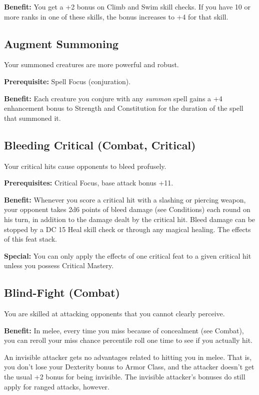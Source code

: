\textbf{Benefit:} You get a +2 bonus on Climb and Swim skill checks. If you have 10 or more ranks in one of these skills, the bonus increases to +4 for that skill.
				
\subsection{Augment Summoning}

				
Your summoned creatures are more powerful and robust.
				
\textbf{Prerequisite:} Spell Focus (conjuration).
				
\textbf{Benefit:} Each creature you conjure with any \textit{summon }spell gains a +4 enhancement bonus to Strength and Constitution for the duration of the spell that summoned it.
				
\subsection{Bleeding Critical (Combat, Critical)}

				
Your critical hits cause opponents to bleed profusely.
				
\textbf{Prerequisites:} Critical Focus, base attack bonus +11.
				
\textbf{Benefit:} Whenever you score a critical hit with a slashing or piercing weapon, your opponent takes 2d6 points of bleed damage (see Conditions) each round on his turn, in addition to the damage dealt by the critical hit. Bleed damage can be stopped by a DC 15 Heal skill check or through any magical healing. The effects of this feat stack.
				
\textbf{Special:} You can only apply the effects of one critical feat to a given critical hit unless you possess Critical Mastery.
				
\subsection{Blind-Fight (Combat)}

				
You are skilled at attacking opponents that you cannot clearly perceive.
				
\textbf{Benefit:} In melee, every time you miss because of concealment (see Combat), you can reroll your miss chance percentile roll one time to see if you actually hit.

An invisible attacker gets no advantages related to hitting you in melee. That is, you don't lose your Dexterity bonus to Armor Class, and the attacker doesn't get the usual +2 bonus for being invisible. The invisible attacker's bonuses do still apply for ranged attacks, however.

